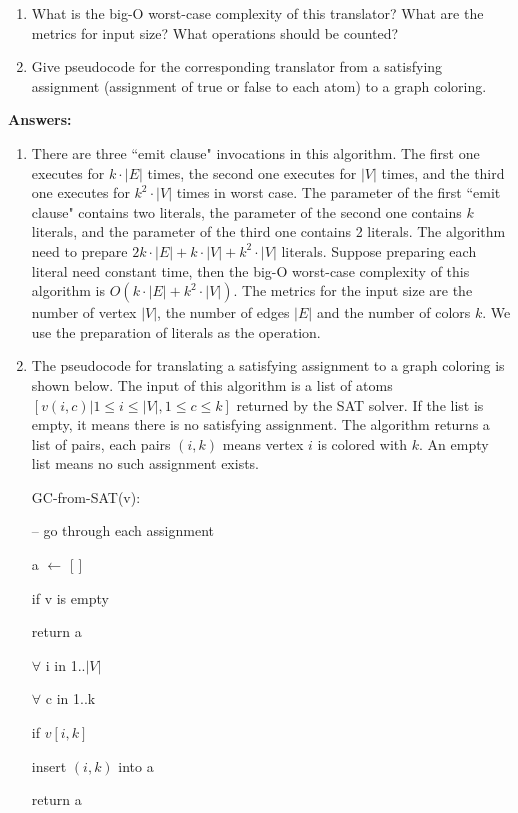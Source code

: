 \documentclass[11pt,letterpaper,oneside]{article}
\begin{document}
\null

\begin{enumerate}
  \itemsep1pt \parskip0pt 
  \item What is the big-O worst-case complexity of this translator? What are the metrics for input size? What operations should be counted?
  \item Give pseudocode for the corresponding translator from a satisfying assignment (assignment of true or false to each atom) to a graph coloring.
\end{enumerate}


\null
\noindent\textbf{Answers:}
\begin{enumerate}
\item There are three ``emit clause" invocations in this algorithm. The first one executes for $k\cdot|E|$ times, the second one executes for $|V|$ times, and the third one executes for $k^2\cdot|V|$ times in worst case. The parameter of the first ``emit clause" contains two literals, the parameter of the second one contains $k$ literals, and the parameter of the third one contains 2 literals. The algorithm need to prepare $2k\cdot|E|+k\cdot|V|+k^2\cdot|V|$ literals. Suppose preparing each literal need constant time, then the big-O worst-case complexity of this algorithm is $O(k\cdot|E|+k^2\cdot|V|)$. The metrics for the input size are the number of vertex $|V|$, the number of edges $|E|$ and the number of colors $k$. We use the preparation of literals as the operation.

\item The pseudocode for translating a satisfying assignment to a graph coloring is shown below. The input of this algorithm is a list of atoms $[v(i,c) | 1\leq i \leq |V|, 1 \leq c \leq k]$ returned by the SAT solver. If the list is empty, it means there is no satisfying assignment. The algorithm returns a list of pairs, each pairs $(i,k)$ means vertex $i$ is colored with $k$. An empty list means no such assignment exists.

\vspace{1em}\hspace{2em} GC-from-SAT(v):

\hspace{3em}     -- go through each assignment

\hspace{3em}     a $\leftarrow$ [ ]

\hspace{3em}     if v is empty

\hspace{4em}         return a

\hspace{3em}     $\forall$ i in 1..$|V|$ 

\hspace{4em}         $\forall$ c in 1..k 

\hspace{5em}             if $v[i,k]$

\hspace{6em}                 insert $(i,k)$ into a

\hspace{3em}     return a

\null

\end{enumerate}
\end{document}

